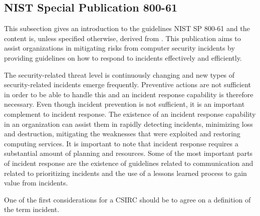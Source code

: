 \subsection{\acs{NIST} Special Publication 800-61}
This subsection gives an introduction to the guidelines \acs{NIST} SP 800-61 and the content is, unless specified otherwise, derived from \cite{nist800-61}. This publication aims to  assist organizations in mitigating risks from computer security incidents by providing guidelines on how to respond to incidents effectively and efficiently. 

The security-related threat level is continuously changing and new types of security-related incidents emerge frequently. Preventive actions are not sufficient in order to be able to handle this and an incident response capability is therefore necessary. Even though incident prevention is not sufficient, it is an important complement to incident response. The existence of an incident response capability in an organization can assist them in rapidly detecting incidents, minimizing loss and destruction, mitigating the weaknesses that were exploited and restoring computing services. It is important to note that incident response requires a substantial amount of planning and resources. Some of the most important parts of incident response are the existence of guidelines related to communication and related to prioritizing incidents and the use of a lessons learned process to gain value from incidents.

One of the first considerations for a \ac{CSIRC} should be to agree on a definition of the term incident.
